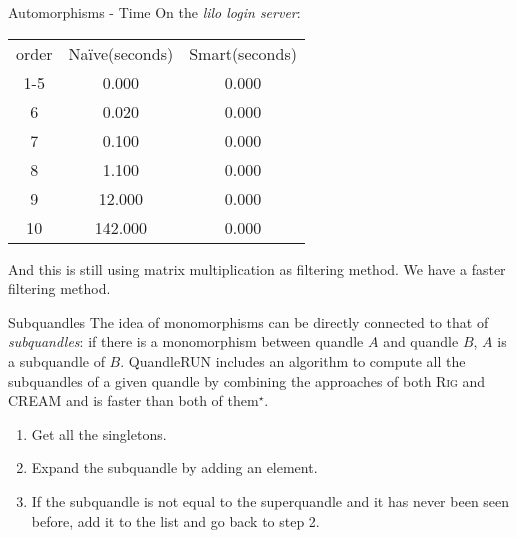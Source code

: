 \begin{frame}{Automorphisms - Time}
On the \emph{lilo login server}: \newline
    \begin{center}
        \begin{tabular}{c|c|c}
         order & Naïve(seconds) & Smart(seconds) \\
         1-5 & 0.000 & 0.000 \\
         6 & 0.020 & 0.000 \\
         7 & 0.100 & 0.000 \\
         8 & 1.100 & 0.000 \\
         9 & 12.000 & 0.000 \\
         10 & 142.000 & 0.000 \\
    \end{tabular}
    \end{center}
    And this is still using matrix multiplication as filtering method. \newline
    We have a faster filtering method. 
\end{frame}

\begin{frame}{Subquandles}
The idea of monomorphisms can be directly connected to that of \emph{subquandles}: if there is a monomorphism between quandle $A$ and quandle $B$, $A$ is a subquandle of $B$. \newline \newline QuandleRUN includes an algorithm to compute all the subquandles of a given quandle by combining the approaches of both \textsc{Rig} and \textsc{CREAM} and is faster than both of them$^\star$.\newline
\begin{enumerate}
    \item Get all the singletons.
    \item Expand the subquandle by adding an element.
    \item If the subquandle is not equal to the superquandle and it has never been seen before, add it to the list and go back to step 2. 
\end{enumerate}
\end{frame}



